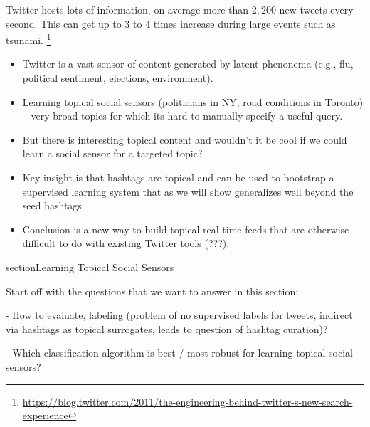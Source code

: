 
\label{sec:introduction}

Twitter hosts lots of information, on average more than $2,200$ new tweets every second. This can get up to $3$ to $4$ times increase during large events such as tsunami. \footnote{\hyperref[]{https://blog.twitter.com/2011/the-engineering-behind-twitter-s-new-search-experience}}
\begin{itemize}
\item Twitter is a vast sensor of content generated by latent phenonema (e.g., flu, political sentiment, elections, environment).
\item Learning topical social sensors (politicians in NY, road conditions in Toronto) -- very broad topics for which its hard to manually specify a useful query.
\item But there is interesting topical content and wouldn't it be cool if we could learn a social sensor for a targeted topic?
\item Key insight is that hashtags are topical and can be used to bootstrap a supervised learning system that as we will show generalizes well beyond the seed hashtags.
\item Conclusion is a new way to build topical real-time feeds that are otherwise difficult to do with existing Twitter tools (???).
\end{itemize}
section{Learning Topical Social Sensors}

Start off with the questions that we want to answer in this section:

- How to evaluate, labeling (problem of no supervised labels for tweets, indirect via hashtags as topical surrogates, leads to question of hashtag curation)?

- Which classification algorithm is best / most robust for learning topical social sensors?
